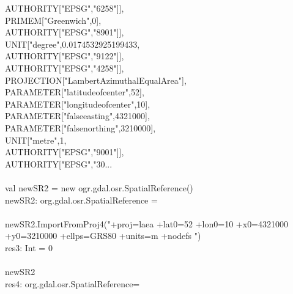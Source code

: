 \documentclass {article}
\begin{document}
\hspace*{8mm} AUTHORITY["EPSG","6258"]],\\
\hspace*{4mm} PRIMEM["Greenwich",0], \\
\hspace*{8mm} AUTHORITY["EPSG","8901"]], \\
\hspace*{4mm} UNIT["degree",0.0174532925199433,\\
\hspace*{8mm} AUTHORITY["EPSG","9122"]],\\
\hspace*{4mm} AUTHORITY["EPSG","4258"]],\\
\hspace*{2mm}PROJECTION["Lambert\underline{\space}Azimuthal\underline{\space}Equal\underline{\space}Area"],\\
\hspace*{2mm} PARAMETER["latitude\underline{\space}of\underline{\space}center",52],\\
\hspace*{2mm} PARAMETER["longitude\underline{\space}of\underline{\space}center",10],\\
\hspace*{2mm} PARAMETER["false\underline{\space}easting",4321000],\\
\hspace*{2mm} PARAMETER["false\underline{\space}northing",3210000],\\
\hspace*{2mm} UNIT["metre",1,\\
\hspace*{4mm} AUTHORITY["EPSG","9001"]],\\
\hspace*{2mm} AUTHORITY["EPSG","30...\\
\\
val newSR2 = new ogr.gdal.osr.SpatialReference() \\
newSR2: org.gdal.osr.SpatialReference = \\
\\
newSR2.ImportFromProj4("+proj=laea +lat\underline{\space}0=52 +lon\underline{\space}0=10 +x\underline{\space}0=4321000 +y\underline{\space}0=3210000 +ellps=GRS80 +units=m +no\underline{\space}defs ") \\
res3: Int = 0 \\
\\
newSR2 \\
res4: org.gdal.osr.SpatialReference= \\
\end{document}
